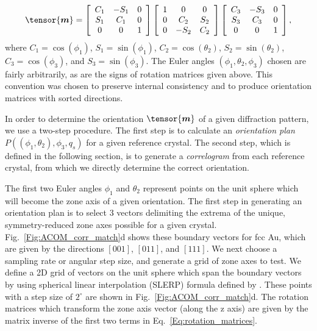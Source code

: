 \documentclass[%
 superscriptaddress,
 aip,
 amsmath,amssymb,
reprint,%
 author-year,%
longbibliography
]{revtex4-2}
\begin{document}
\begin{equation}
    \tensor{\bm{m}} =
    \left[
      \begin{array}{ccc}
        C_1 & -S_1 & 0 \\
        S_1 & C_1 & 0 \\
        0 & 0 & 1  \\  
      \end{array}
    \right]
    \left[
      \begin{array}{ccc}
        1 & 0 & 0  \\  
        0 & C_2 & S_2 \\
        0 & -S_2 & C_2 \\
      \end{array}
    \right]
    \left[
      \begin{array}{ccc}
        C_3 & -S_3 & 0 \\
        S_3 & C_3 & 0 \\
        0 & 0 & 1  \\   
      \end{array}
    \right],
    \label{Eq:rotation_matrices}
\end{equation}
where $C_1 = \cos(\phi_1)$, $S_1 = \sin(\phi_1)$, $C_2 = \cos(\theta_2)$, $S_2 = \sin(\theta_2)$, $C_3 = \cos(\phi_3)$, and  $S_3 = \sin(\phi_3)$. The Euler angles $(\phi_1, \theta_2, \phi_3)$ chosen are fairly arbitrarily, as are the signs of rotation matrices given above. This convention was chosen to preserve internal consistency and to produce orientation matrices with sorted directions.

In order to determine the orientation $\tensor{\bm{m}}$ of a given diffraction pattern, we use a two-step procedure. The first step is to calculate an \emph{orientation plan} $ P((\phi_1, \theta_2), \phi_3, q_s)$ for a given reference crystal. The second step, which is defined in the following section, is to generate a \emph{correlogram} from each reference crystal, from which we directly determine the correct orientation. 

The first two Euler angles $\phi_1$ and $\theta_2$ represent points on the unit sphere which will become the zone axis of a given orientation. The first step in generating an orientation plan is to select 3 vectors delimiting the extrema of the unique, symmetry-reduced zone axes possible for a given crystal. Fig.~\ref{Fig:ACOM_corr_match}d shows these boundary vectors for fcc Au, which are given by the directions $[001]$, $[011]$, and $[111]$. We next choose a sampling rate or angular step size, and generate a grid of zone axes to test. We define a 2D grid of vectors on the unit sphere which span the boundary vectors by using spherical linear interpolation (SLERP) formula defined by \cite{shoemake1985animating}. These points with a step size of $2^\circ$ are shown in Fig.~\ref{Fig:ACOM_corr_match}d. The rotation matrices which transform the zone axis vector (along the z axis) are given by the matrix inverse of the first two terms in Eq.~\ref{Eq:rotation_matrices}.
\end{document}
